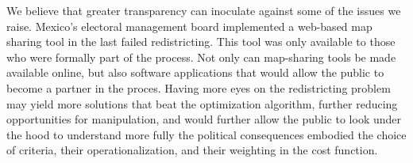 \documentclass[letter,12pt]{article}
\begin{document}
We believe that greater transparency can inoculate against some of the issues we raise. Mexico's electoral management board implemented a web-based map sharing tool in the last failed redistricting. This tool was only available to those who were formally part of the process. Not only can map-sharing tools be made available online, but also software applications that would allow the public to become a partner in the proces\citep{trelles.datosabiertos.2015}. Having more eyes on the redistricting problem may yield more solutions that beat the optimization algorithm, further reducing opportunities for manipulation, and would further allow the public to look under the hood to understand more fully the political consequences embodied the choice of criteria, their operationalization, and their weighting in the cost function.





\end{document}
